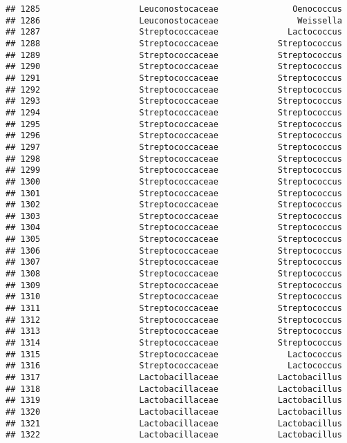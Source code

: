 \documentclass[
]{article}
\begin{document}
\begin{verbatim}
## 1285                    Leuconostocaceae               Oenococcus
## 1286                    Leuconostocaceae                Weissella
## 1287                    Streptococcaceae              Lactococcus
## 1288                    Streptococcaceae            Streptococcus
## 1289                    Streptococcaceae            Streptococcus
## 1290                    Streptococcaceae            Streptococcus
## 1291                    Streptococcaceae            Streptococcus
## 1292                    Streptococcaceae            Streptococcus
## 1293                    Streptococcaceae            Streptococcus
## 1294                    Streptococcaceae            Streptococcus
## 1295                    Streptococcaceae            Streptococcus
## 1296                    Streptococcaceae            Streptococcus
## 1297                    Streptococcaceae            Streptococcus
## 1298                    Streptococcaceae            Streptococcus
## 1299                    Streptococcaceae            Streptococcus
## 1300                    Streptococcaceae            Streptococcus
## 1301                    Streptococcaceae            Streptococcus
## 1302                    Streptococcaceae            Streptococcus
## 1303                    Streptococcaceae            Streptococcus
## 1304                    Streptococcaceae            Streptococcus
## 1305                    Streptococcaceae            Streptococcus
## 1306                    Streptococcaceae            Streptococcus
## 1307                    Streptococcaceae            Streptococcus
## 1308                    Streptococcaceae            Streptococcus
## 1309                    Streptococcaceae            Streptococcus
## 1310                    Streptococcaceae            Streptococcus
## 1311                    Streptococcaceae            Streptococcus
## 1312                    Streptococcaceae            Streptococcus
## 1313                    Streptococcaceae            Streptococcus
## 1314                    Streptococcaceae            Streptococcus
## 1315                    Streptococcaceae              Lactococcus
## 1316                    Streptococcaceae              Lactococcus
## 1317                    Lactobacillaceae            Lactobacillus
## 1318                    Lactobacillaceae            Lactobacillus
## 1319                    Lactobacillaceae            Lactobacillus
## 1320                    Lactobacillaceae            Lactobacillus
## 1321                    Lactobacillaceae            Lactobacillus
## 1322                    Lactobacillaceae            Lactobacillus

\end{verbatim}
\end{document}
